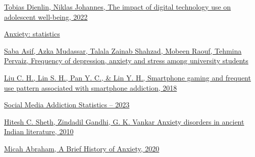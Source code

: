 \documentclass[a4paper]{article}
\begin{document}
		\begin{thebibliography}{9}
			
                \href{https://www.tandfonline.com/doi/full/10.31887/DCNS.2020.22.2/tdienlin?scroll=top&needAccess=true&role=tab&aria-labelledby=full-article}{ Tobias Dienlin, Niklas Johannes, The impact of digital technology use on adolescent well-being, 2022}
			
		
                \href{https://www.mentalhealth.org.uk/explore-mental-health/mental-health-statistics/anxiety-statistics}{ Anxiety: statistics}

                \href{https://www.ncbi.nlm.nih.gov/pmc/articles/PMC7372668/}{Saba Asif, Azka Mudassar, Talala Zainab Shahzad, Mobeen Raouf, Tehmina Pervaiz, Frequency of depression, anxiety and stress among university students}

                \href{https://www.researchgate.net/publication/305345662_Smartphone_gaming_and_frequent_use_pattern_associated_with_smartphone_addiction}{ Liu C. H., Lin S. H., Pan Y. C., & Lin Y. H., Smartphone gaming and frequent use pattern associated with smartphone addiction, 2018 }

                \href{ https://truelist.co/blog/social-media-addiction-statistics/}{ Social Media Addiction Statistics – 2023}
	
		
                \href{ https://www.ncbi.nlm.nih.gov/pmc/articles/PMC2990839/#sec1-1title}{ Hitesh C. Sheth, Zindadil Gandhi, G. K. Vankar Anxiety disorders in ancient Indian literature, 2010}

                \href{ https://www.calmclinic.com/brief-history-of-anxiety}{  Micah Abraham, A Brief History of Anxiety, 2020
}
                
		\end{thebibliography}
		
		
	
\end{document}
